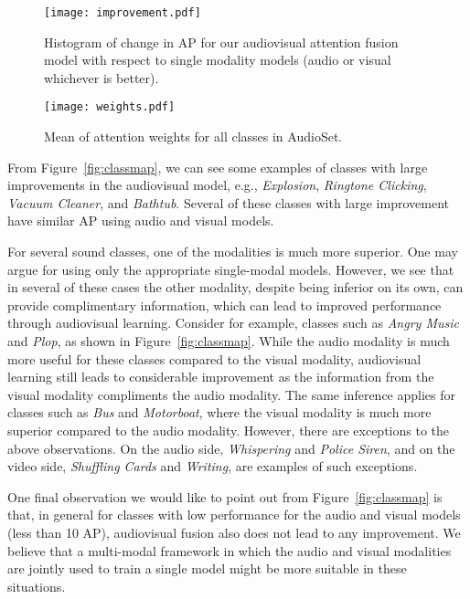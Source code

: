 \documentclass{article}
\begin{document}
\begin{figure}[t]
	\centering
	\texttt{[image: improvement.pdf]}
	\caption{Histogram of change in AP for our audiovisual attention fusion model with respect to single modality models (audio or visual whichever is better).}\label{fig:improvement}
\end{figure}

\begin{figure}[t]
	\centering
	\texttt{[image: weights.pdf]}
	\caption{Mean of attention weights for all classes in AudioSet.}\label{fig:weights}
\end{figure}

From Figure~\ref{fig:classmap}, we can see some examples of classes with large improvements in the audiovisual model, e.g., \emph{Explosion}, \emph{Ringtone Clicking}, \emph{Vacuum Cleaner}, and \emph{Bathtub}.
Several of these classes with large improvement have similar AP using audio and visual models.

For several sound classes, one of the modalities is much more superior.
One may argue for using only the appropriate single-modal models.
However, we see that in several of these cases the other modality, despite being inferior on its own, can provide complimentary information, which can lead to improved performance through audiovisual learning.
Consider for example, classes such as \emph{Angry Music} and \emph{Plop}, as shown in Figure~\ref{fig:classmap}.
While the audio modality is much more useful for these classes compared to the visual modality, audiovisual learning still leads to considerable improvement as the information from the visual modality compliments the audio modality.
The same inference applies for classes such as \emph{Bus} and \emph{Motorboat}, where the visual modality is much more superior compared to the audio modality. However, there are exceptions to the above observations.
On the audio side, \emph{Whispering} and \emph{Police Siren}, and on the video side, \emph{Shuffling Cards} and \emph{Writing}, are examples of such exceptions.

One final observation we would like to point out from Figure~\ref{fig:classmap} is that, in general for classes with low performance for the audio and visual models (less than 10 AP), audiovisual fusion also does not lead to any improvement.
We believe that a multi-modal framework in which the audio and visual modalities are jointly used to train a single model might be more suitable in these situations.
\end{document}
